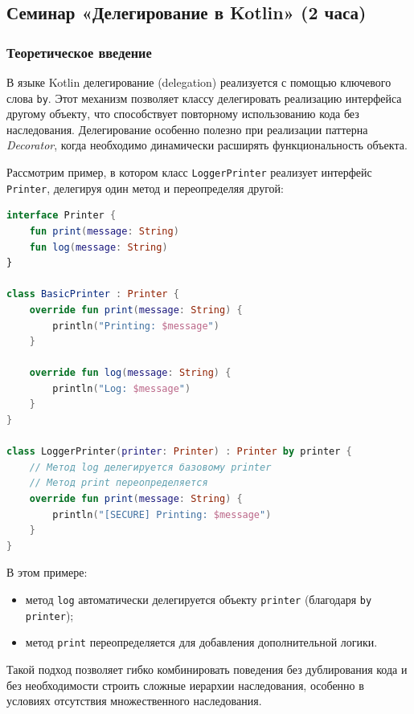 \subsection{Семинар «Делегирование в Kotlin» (2 часа)}

\subsubsection*{Теоретическое введение}

В языке Kotlin делегирование (delegation) реализуется с помощью ключевого слова \texttt{by}. Этот механизм позволяет классу делегировать реализацию интерфейса другому объекту, что способствует повторному использованию кода без наследования. Делегирование особенно полезно при реализации паттерна \textit{Decorator}, когда необходимо динамически расширять функциональность объекта.

Рассмотрим пример, в котором класс \texttt{LoggerPrinter} реализует интерфейс \texttt{Printer}, делегируя один метод и переопределяя другой:

\begin{lstlisting}[language=Kotlin, basicstyle=\ttfamily\small]
interface Printer {
    fun print(message: String)
    fun log(message: String)
}

class BasicPrinter : Printer {
    override fun print(message: String) {
        println("Printing: $message")
    }

    override fun log(message: String) {
        println("Log: $message")
    }
}

class LoggerPrinter(printer: Printer) : Printer by printer {
    // Метод log делегируется базовому printer
    // Метод print переопределяется
    override fun print(message: String) {
        println("[SECURE] Printing: $message")
    }
}
\end{lstlisting}

В этом примере:
\begin{itemize}
    \item метод \texttt{log} автоматически делегируется объекту \texttt{printer} (благодаря \texttt{by printer});
    \item метод \texttt{print} переопределяется для добавления дополнительной логики.
\end{itemize}

Такой подход позволяет гибко комбинировать поведения без дублирования кода и без необходимости строить сложные иерархии наследования, особенно в условиях отсутствия множественного наследования.

